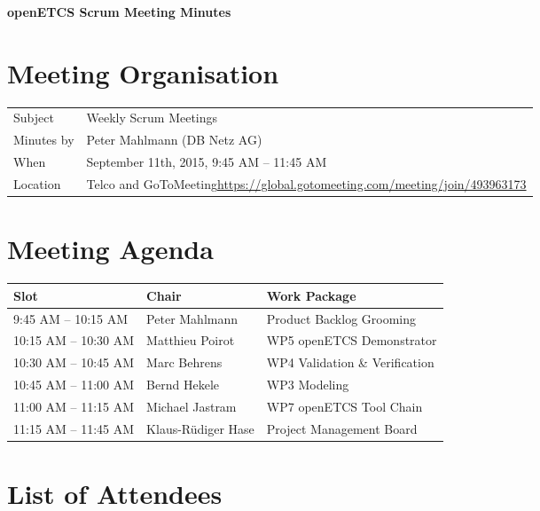 \documentclass[a4paper, 11pt]{article}
\begin{document}
{\begin{center}\huge\bf openETCS Scrum Meeting Minutes\end{center}}

\section{Meeting Organisation}

\renewcommand{\arraystretch}{1.5}
\begin{supertabular}{m{.2\textwidth}m{.8\textwidth}}
Subject & Weekly Scrum Meetings\\
Minutes by & Peter Mahlmann (DB Netz AG)\\
When & September 11th, 2015, 9:45 AM -- 11:45 AM\\
Location & Telco and GoToMeeting\newline \url{https://global.gotomeeting.com/meeting/join/493963173}\\
\end{supertabular}

\renewcommand{\arraystretch}{1.0}
\section{Meeting Agenda}

\begin{tabular}{lll}
\toprule
\textbf{Slot} &  \textbf{Chair} & \textbf{Work Package} \\
\midrule 
9:45 AM -- 10:15 AM & Peter Mahlmann & Product Backlog Grooming  \\
10:15 AM -- 10:30 AM & Matthieu Poirot & WP5 openETCS Demonstrator \\  
10:30 AM -- 10:45 AM & Marc Behrens & WP4 Validation \& Verification \\
10:45 AM -- 11:00 AM & Bernd Hekele & WP3 Modeling \\
11:00 AM -- 11:15 AM & Michael Jastram  & WP7 openETCS Tool Chain \\
11:15 AM -- 11:45 AM & Klaus-R\"udiger Hase & Project Management Board \\
\bottomrule
\end{tabular}

\section{List of Attendees}
\end{document}
